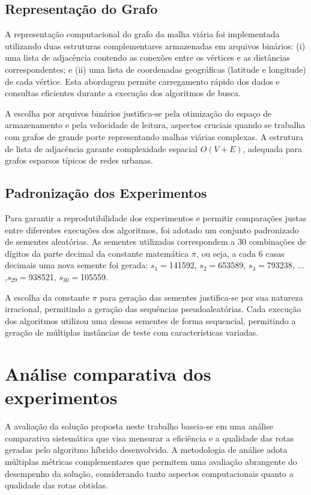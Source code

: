 \subsection{Representação do Grafo}

A representação computacional do grafo da malha viária foi implementada utilizando duas estruturas 
complementares armazenadas em arquivos binários: (i) uma lista de adjacência contendo as conexões 
entre os vértices e as distâncias correspondentes; e (ii) uma lista de coordenadas geográficas 
(latitude e longitude) de cada vértice. Esta abordagem permite carregamento rápido dos dados e 
consultas eficientes durante a execução dos algoritmos de busca.

A escolha por arquivos binários justifica-se pela otimização do espaço de armazenamento e pela 
velocidade de leitura, aspectos cruciais quando se trabalha com grafos de grande porte representando 
malhas viárias complexas. A estrutura de lista de adjacência garante complexidade espacial $O(V + E)$, 
adequada para grafos esparsos típicos de redes urbanas.

\subsection{Padronização dos Experimentos}
\label{chap:metodologia:padronizacao_dos_experimentos}

Para garantir a reprodutibilidade dos experimentos e permitir comparações justas entre diferentes 
execuções dos algoritmos, foi adotado um conjunto padronizado de sementes aleatórias. As sementes 
utilizadas correspondem a 30 combinações de dígitos da parte decimal da constante matemática $\pi$, ou seja, a
cada 6 casas decimais uma nova semente foi gerada: 
$s_1=$141592, $s_2=$653589, $s_3=$793238, ... ,$s_{29}=$938521, $s_{30}=$105559.

A escolha da constante $\pi$ para geração das sementes justifica-se por sua natureza irracional, 
permitindo a geração das sequências pseudoaleatórias. Cada execução 
dos algoritmos utilizou uma dessas sementes de forma sequencial, permitindo a geração de múltiplas 
instâncias de teste com características variadas.




\section{Análise comparativa dos experimentos}

A avaliação da solução proposta neste trabalho baseia-se em uma análise comparativa sistemática 
que visa mensurar a eficiência e a qualidade das rotas geradas pelo algoritmo híbrido desenvolvido. 
A metodologia de análise adota múltiplas métricas complementares que permitem uma avaliação 
abrangente do desempenho da solução, considerando tanto aspectos computacionais quanto a 
qualidade das rotas obtidas.



